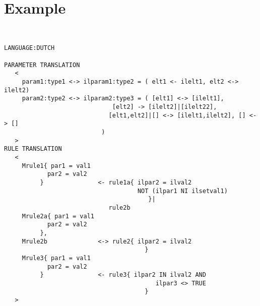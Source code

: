 \section{Example}
\begin{verbatim}


LANGUAGE:DUTCH

PARAMETER TRANSLATION
   <
     param1:type1 <-> ilparam1:type2 = ( elt1 <- ilelt1, elt2 <-> ilelt2)
     param2:type2 <-> ilparam2:type3 = ( [elt1] <-> [ilelt1],
                              [elt2] -> [ilelt2]|[ilelt22],
                             [elt1,elt2]|[] <-> [ilelt1,ilelt2], [] <-> []
                           )
   >
RULE TRANSLATION
   <
     Mrule1{ par1 = val1
            par2 = val2
          }               <- rule1a{ ilpar2 = ilval2
                                     NOT (ilpar1 NI ilsetval1)
                                        }|
                             rule2b
     Mrule2a{ par1 = val1
            par2 = val2
          },
     Mrule2b              <-> rule2{ ilpar2 = ilval2
                                       }
     Mrule3{ par1 = val1
            par2 = val2
          }               <- rule3{ ilpar2 IN ilval2 AND
                                          ilpar3 <> TRUE
                                       }
   >

\end{verbatim}
